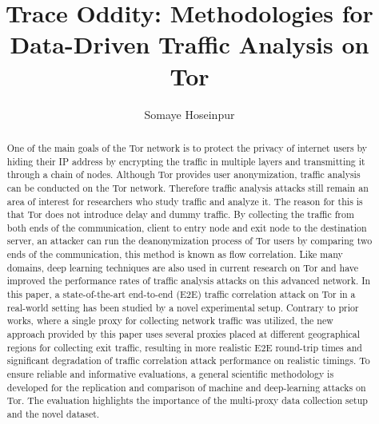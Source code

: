 \documentclass[sigconf]{acmart}
\begin{document}
\fancyhead{}  %

\title{Trace Oddity: Methodologies for Data-Driven Traffic Analysis on Tor}

\author{Somaye Hoseinpur}





\begin{abstract}
One of the main goals of the Tor network is to protect the privacy of internet users by hiding their IP address by encrypting the traffic in multiple layers and transmitting it through a chain of nodes. Although Tor provides user anonymization, traffic analysis can be conducted on the Tor network. Therefore traffic analysis attacks still remain an area of interest for researchers who study traffic and analyze it. The reason for this is that Tor does not introduce delay and dummy traffic. By collecting the traffic from both ends of the communication, client to entry node and exit node to the destination server, an attacker can run the deanonymization process of Tor users by comparing two ends of the communication, this method is known as flow correlation. Like many domains, deep learning techniques are also used in current research on Tor and have improved the performance rates of traffic analysis attacks on this advanced network. In this paper, a state-of-the-art end-to-end (E2E) traffic correlation attack on Tor in a real-world setting has been studied by a novel experimental setup. Contrary to prior works, where a single proxy for collecting network traffic was utilized, the new approach provided by this paper uses several proxies placed at different geographical regions for collecting exit traffic, resulting in more realistic E2E round-trip times and significant degradation of traffic correlation attack performance on realistic timings. To ensure reliable and informative evaluations, a general scientific methodology is developed for the replication and comparison of machine and deep-learning attacks on Tor. The evaluation highlights the importance of the multi-proxy data collection setup and the novel dataset.
\end{abstract}
\end{document}
